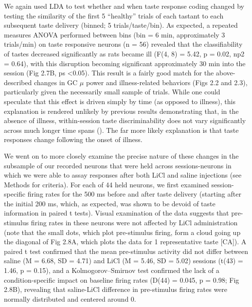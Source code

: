 \begin{refsection}
We again used LDA to test whether and when taste response coding changed by testing the similarity of the first 5 “healthy” trials of each tastant to each subsequent taste delivery (binned; 5 trials/taste/bin). As expected, a repeated measures ANOVA performed between bins (bin = 6 min, approximately 3 trials/min) on taste responsive neurons (n = 56) revealed that the classifiability of tastes decreased significantly as rats became ill (F(4, 8) = 5.42, p = 0.02, np2 = 0.64), with this disruption becoming significant approximately 30 min into the session (Fig 2.7B, ps \textless 0.05). This result is a fairly good match for the above-described changes in GC \(\mu\) power and illness-related behaviors (Figs 2.2 and 2.3), particularly given the necessarily small sample of trials. While one could speculate that this effect is driven simply by time (as opposed to illness), this explanation is rendered unlikely by previous results demonstrating that, in the absence of illness, within-session taste discriminability does not vary significantly across much longer time spans (\cite{fontanini2006a}). The far more likely explanation is that taste responses change following the onset of illness.

We went on to more closely examine the precise nature of these changes in the subsample of our recorded neurons that were held across sessions-neurons in which we were able to assay responses after both LiCl and saline injections (see Methods for criteria). For each of 44 held neurons, we first examined session-specific firing rates for the 500 ms before and after taste delivery (starting after the initial 200 ms, which, as expected, was shown to be devoid of taste information in paired t tests). Visual examination of the data suggests that pre-stimulus firing rates in these neurons were not affected by LiCl administration (note that the small dots, which plot pre-stimulus firing, form a cloud going up the diagonal of Fig 2.8A, which plots the data for 1 representative taste [CA]). A paired t test confirmed that the mean pre-stimulus activity did not differ between saline (M = 6.68, SD = 4.71) and LiCl (M = 5.46, SD = 5.02) sessions (t(43) = 1.46, p = 0.15), and a Kolmogorov–Smirnov test confirmed the lack of a condition-specific impact on baseline firing rates (D(44) = 0.045, p = 0.98; Fig 2.8B), revealing that saline-LiCl difference in pre-stimulus firing rates were normally distributed and centered around 0.


\end{refsection}
